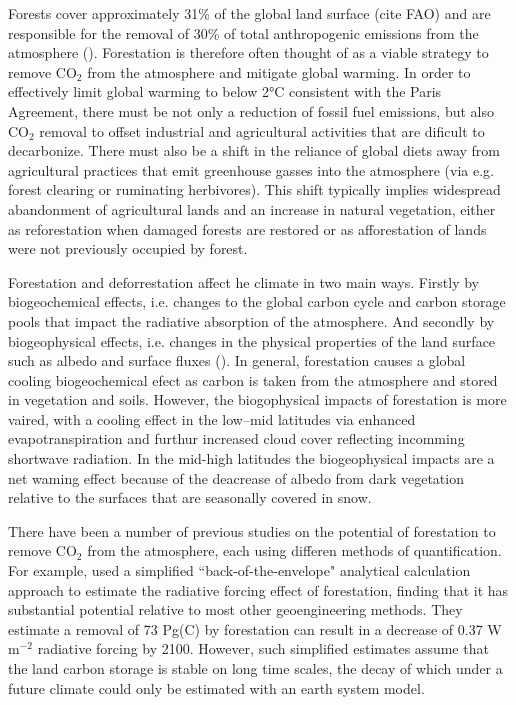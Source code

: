 \documentclass[]{article}
\begin{document}
Forests cover approximately 31\% of the global land surface (cite FAO) and are responsible for the removal of 30\% of total anthropogenic emissions from the atmosphere (\cite{friedlingstein_global_2022}).
Forestation is therefore often thought of as a viable strategy to remove CO$_2$ from the atmosphere and mitigate global warming.
In order to effectively limit global warming to below 2°C consistent with the Paris Agreement, there must be not only a reduction of fossil fuel emissions, but also CO$_2$ removal to offset industrial and agricultural activities that are dificult to decarbonize.
There must also be a shift in the reliance of global diets away from agricultural practices that emit greenhouse gasses into the atmosphere (via e.g. forest clearing or ruminating herbivores).
This shift typically implies widespread abandonment of agricultural lands and an increase in natural vegetation, either as reforestation when damaged forests are restored or as afforestation of lands were not previously occupied by forest.

Forestation and deforrestation affect he climate in two main ways.
Firstly by biogeochemical effects, i.e. changes to the global carbon cycle and carbon storage pools that impact the radiative absorption of the atmosphere.
And secondly by biogeophysical effects, i.e. changes in the physical properties of the land surface such as albedo and surface fluxes (\cite{bala_combined_2007}).
In general, forestation causes a global cooling biogeochemical efect as carbon is taken from the atmosphere and stored in vegetation and soils.
However, the biogophysical impacts of forestation is more vaired, with a cooling effect in the low–mid latitudes via enhanced evapotranspiration and furthur increased cloud cover reflecting incomming shortwave radiation.
In the mid-high latitudes the biogeophysical impacts are a net waming effect because of the deacrease of albedo from dark vegetation relative to the surfaces that are seasonally covered in snow.

There have been a number of previous studies on the potential of forestation to remove CO$_2$ from the atmosphere, each using differen methods of quantification.
For example, \cite{lenton_radiative_2009} used a simplified ``back-of-the-envelope" analytical calculation approach to estimate the radiative forcing effect of forestation, finding that it has substantial potential relative to most other geoengineering methods.
They estimate a removal of 73 Pg(C) by forestation can result in a decrease of 0.37 W m$^{-2}$ radiative forcing by 2100.
However, such simplified estimates assume that the land carbon storage is stable on long time scales, the decay of which under a future climate could only be estimated with an earth system model.
\end{document}

